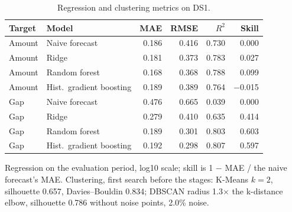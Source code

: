 \begin{table}[htbp]
\centering
\footnotesize
\caption{Regression and clustering metrics on DS1.}
\label{tab:unsupervised}
\begin{tabularx}{\textwidth}{@{}l Y r r r r@{}}
\toprule
Target & Model & MAE & RMSE & $R^2$ & Skill \\
\midrule
Amount & Naive forecast & 0.186 & 0.416 & 0.730 & 0.000 \\
Amount & Ridge & 0.181 & 0.373 & 0.783 & 0.027 \\
Amount & Random forest & 0.168 & 0.368 & 0.788 & 0.099 \\
Amount & Hist.\ gradient boosting & 0.189 & 0.389 & 0.764 & $-$0.015 \\
Gap & Naive forecast & 0.476 & 0.665 & 0.039 & 0.000 \\
Gap & Ridge & 0.279 & 0.410 & 0.635 & 0.414 \\
Gap & Random forest & 0.189 & 0.301 & 0.803 & 0.603 \\
Gap & Hist.\ gradient boosting & 0.192 & 0.298 & 0.807 & 0.597 \\
\bottomrule
\end{tabularx}
\par\smallskip\parbox{\textwidth}{\footnotesize Regression on the evaluation period, log10 scale; skill is 1 $-$ MAE / the naive forecast's MAE. Clustering, first search before the stages: K-Means $k=2$, silhouette 0.657, Davies--Bouldin 0.834; DBSCAN radius 1.3$\times$ the k-distance elbow, silhouette 0.786 without noise points, 2.0\% noise.}
\end{table}
